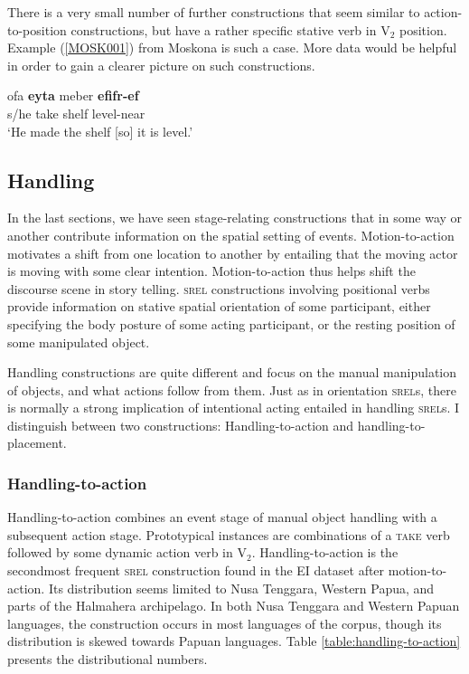 There is a very small number of further constructions that seem similar to action-to-position constructions, but have a rather specific stative verb in V$_2$ position. Example (\ref{MOSK001}) from Moskona is such a case. More data would be helpful in order to gain a clearer picture on such constructions.

\ea \label{MOSK001}
\gll ofa \textbf{eyta} meber \textbf{efifr-ef} \\
s/he take shelf level-near \\
\glft ‘He made the shelf [so] it is level.’ \\ 
\z
\xe

\subsection{Handling}

In the last sections, we have seen stage-relating constructions that in some way or another contribute information on the spatial setting of events. Motion-to-action motivates a shift from one location to another by entailing that the moving actor is moving with some clear intention. Motion-to-action thus helps shift the discourse scene in story telling. \textsc{srel} constructions involving positional verbs provide information on stative spatial orientation of some participant, either specifying the body posture of some acting participant, or the resting position of some manipulated object. 

Handling constructions are quite different and focus on the manual manipulation of objects, and what actions follow from them. Just as in orientation \textsc{srel}s, there is normally a strong implication of intentional acting entailed in handling \textsc{srel}s. I distinguish between two constructions: Handling-to-action and handling-to-placement. 

\subsubsection{Handling-to-action} \label{sec:handling-to-action}

Handling-to-action combines an event stage of manual object handling with a subsequent action stage. Prototypical instances are combinations of a \textsc{take} verb followed by some dynamic action verb in V$_2$. Handling-to-action is the secondmost frequent \textsc{srel} construction found in the EI dataset after motion-to-action. Its distribution seems limited to Nusa Tenggara, Western Papua, and parts of the Halmahera archipelago. In both Nusa Tenggara and Western Papuan languages, the construction occurs in most languages of the corpus, though its distribution is skewed towards Papuan languages. Table \ref{table:handling-to-action} presents the distributional numbers.

